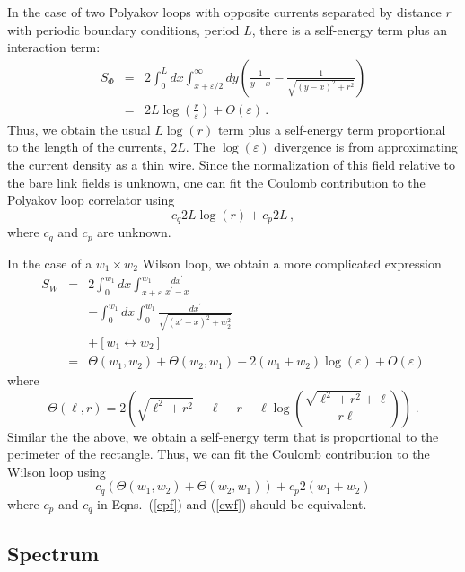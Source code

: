 \documentclass[preprint,aps,prd]{revtex4-2}
\newcommand{\be}{\begin{equation}}
\newcommand{\eq}{\end{equation}}
\begin{document}
In the case of two Polyakov loops with opposite currents separated
by distance $r$ with periodic boundary conditions, period $L$,
there is a self-energy term plus an interaction term:
%
\begin{eqnarray}
S_\Phi &=& 2 \int_0^L dx \int_{x+\varepsilon/2}^\infty dy
\left(\frac{1}{y-x} -\frac{1}{\sqrt{(y-x)^2 + r^2}}\right) \\
  &=& 2 L \log\left(\frac{r}{\varepsilon}\right) + O(\varepsilon)\, .
\end{eqnarray}
%
Thus, we obtain the usual $L \log(r)$ term plus a
self-energy term proportional to the length
of the currents, $2L$.  The $\log(\varepsilon)$ divergence
is from approximating the current density as a thin wire.
Since the normalization
of this field relative to the bare link fields is
unknown, one can fit the Coulomb contribution to the
Polyakov loop correlator using
\be
       c_q 2 L \log(r) + c_p 2 L \, , \label{cpf}
\eq
where $c_q$ and $c_p$ are unknown.

In the case of a $w_1\times w_2$ Wilson loop, we obtain
a more complicated expression
%
\begin{eqnarray}
  S_W &=& 2 \int_0^{w_1} dx \int_{x+\varepsilon}^{w_1} \frac{dx^\prime}{x^\prime-x}
               \nonumber\\
               & &  - \int_0^{w_1} dx \int_{0}^{w_1} \frac{dx^\prime}{
                 \sqrt{(x^\prime-x)^2+ w_2^2}}
               \nonumber\\
               & &  +\left[w_1 \leftrightarrow w_2 \right]\\
               &=&  \Theta\!\left(w_1, w_2\right) +
               \Theta\!\left(w_2, w_1\right)
              - 2 (w_1 + w_2) \log(\varepsilon) + O(\varepsilon) 
\end{eqnarray}
where
\be
\Theta\!\left(\ell, r\right) = 2 \left(
    \sqrt{\ell^2+r^2} - \ell - r
    - \ell\log\left(\frac{\sqrt{\ell^2+r^2} + \ell}{r\ell}\right)
   \right) \;.
\eq
Similar the the above, 
we obtain a self-energy term that is proportional to the perimeter of
the rectangle.  Thus, we can fit the Coulomb
contribution to the Wilson loop using
%
\be
    c_q  \left(\Theta\!\left(w_1, w_2\right) +
               \Theta\!\left(w_2, w_1\right)\right)
        + c_p  2\left(w_1+w_2\right)  \label{cwf}
\eq
%
where $c_p$ and $c_q$ in Eqns.~(\ref{cpf}) and (\ref{cwf})
should be equivalent.


\subsection{Spectrum}
\end{document}
